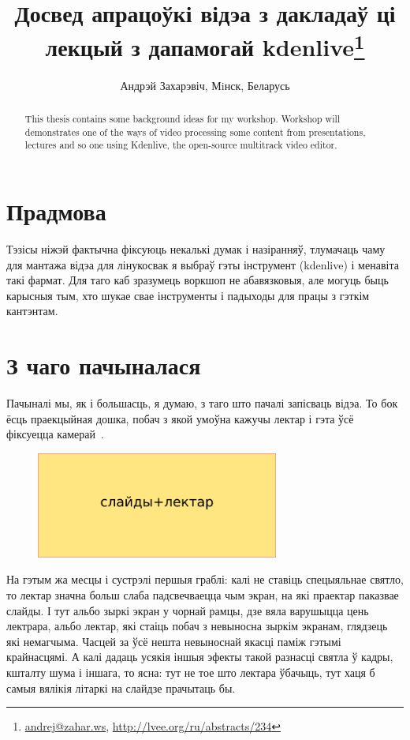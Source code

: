 \documentclass[10pt, a5paper]{article}
\begin{document}
\title{Досвед апрацоўкі відэа з дакладаў ці лекцый з дапамогай kdenlive\footnote{\url{andrej@zahar.ws}, \url{http://lvee.org/ru/abstracts/234}}}
\author{Андрэй Захарэвіч, Мiнск, Беларусь}
\maketitle
\begin{abstract}
This thesis contains some background ideas for my workshop. Workshop will demonstrates one of the ways of video processing some content from presentations, lectures and so one using \linebreak Kdenlive, the open-source multitrack video editor.
\end{abstract}
\section*{Прадмова}

Тэзісы ніжэй фактычна фіксуюць некалькі думак і назіранняў, тлумачаць чаму для мантажа відэа для лінукосвак я выбраў гэты інструмент (kdenlive) і менавіта такі фармат. Для таго каб зразумець воркшоп не абавязковыя, але могуць быць карысныя тым, хто шукае свае інструменты і падыходы для працы з гэткім кантэнтам.

\section*{З чаго пачыналася}

Пачыналі мы, як і большасць, я думаю, з таго што пачалі запісваць відэа. То бок ёсць праекцыйная дошка, побач з якой умоўна кажучы лектар і гэта ўсё фіксуецца камерай~\cite{Zakharevich1}.


\begin{figure}[h!]
  \centering
  \includegraphics[width=8cm]{32_2016_Zakharevich1.png}
\end{figure}

На гэтым жа месцы і сустрэлі першыя граблі: калі не ставіць спецыяльнае святло, то лектар значна больш слаба падсвечваецца чым экран, на які праектар паказвае слайды. І тут альбо зыркі экран у чорнай рамцы, дзе вяла варушыцца цень лектрара, альбо лектар, які стаіць побач з невыносна зыркім экранам, глядзець які немагчыма. Часцей за ўсё нешта невыноснай якасці паміж гэтымі крайнасцямі. А калі дадаць усякія іншыя эфекты такой разнасці святла ў кадры, кшталту шума і іншага, то ясна: тут не тое што лектара ўбачыць, тут хаця б самыя вялікія літаркі на слайдзе прачытаць бы.
\end{document}
